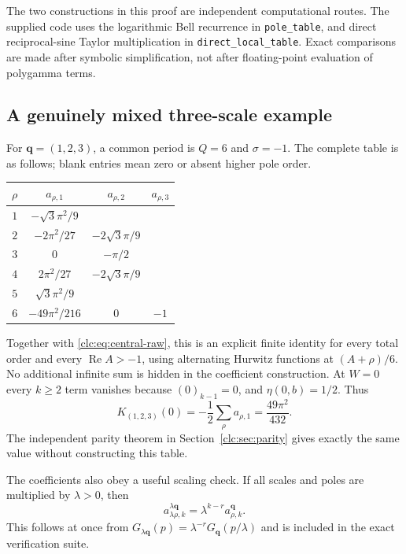 \documentclass[11pt,a4paper]{article}
\numberwithin{equation}{section}
\theoremstyle{definition}\newtheorem{definition}[theorem]{Definition}
\theoremstyle{remark}\newtheorem{remark}[theorem]{Remark}
\DeclareMathOperator{\Rea}{Re}
\newcommand{\bq}{\boldsymbol q}\newcommand{\bs}{\boldsymbol s}
\begin{document}
The two constructions in this proof are independent computational
routes. The supplied code uses the logarithmic Bell recurrence in
\texttt{pole\_table}, and direct reciprocal-sine Taylor multiplication in
\texttt{direct\_local\_table}. Exact comparisons are made after symbolic
simplification, not after floating-point evaluation of polygamma terms.

\subsection{A genuinely mixed three-scale example}
For $\bq=(1,2,3)$, a common period is $Q=6$ and $\sigma=-1$.
The complete table is as follows; blank entries mean zero or absent
higher pole order.
\begin{center}
\begin{tabular}{c c c c}
\toprule
$\rho$ & $a_{\rho,1}$ & $a_{\rho,2}$ & $a_{\rho,3}$\\
\midrule
$1$ & $-\sqrt3\pi^2/9$ & &\\
$2$ & $-2\pi^2/27$ & $-2\sqrt3\pi/9$ &\\
$3$ & $0$ & $-\pi/2$ &\\
$4$ & $2\pi^2/27$ & $-2\sqrt3\pi/9$ &\\
$5$ & $\sqrt3\pi^2/9$ & &\\
$6$ & $-49\pi^2/216$ & $0$ & $-1$\\
\bottomrule
\end{tabular}
\end{center}
Together with \eqref{clc:eq:central-raw}, this is an explicit finite
identity for every total order and every $\Rea A>-1$, using alternating
Hurwitz functions at $(A+\rho)/6$. No additional infinite sum is hidden
in the coefficient construction.
At $W=0$ every $k\ge2$ term vanishes because $(0)_{k-1}=0$, and
$\eta(0,b)=1/2$. Thus
\begin{equation}\label{clc:eq:123zero}
 K_{(1,2,3)}(0)=-\frac12\sum_\rho a_{\rho,1}
 =\frac{49\pi^2}{432}.
\end{equation}
The independent parity theorem in Section~\ref{clc:sec:parity} gives
exactly the same value without constructing this table.

The coefficients also obey a useful scaling check. If all scales and
poles are multiplied by $\lambda>0$, then
\begin{equation}\label{clc:eq:coef-scaling}
 a^{\lambda\bq}_{\lambda\rho,k}
 =\lambda^{k-r}a^{\bq}_{\rho,k}.
\end{equation}
This follows at once from
$G_{\lambda\bq}(p)=\lambda^{-r}G_{\bq}(p/\lambda)$ and is included
in the exact verification suite.
\end{document}
